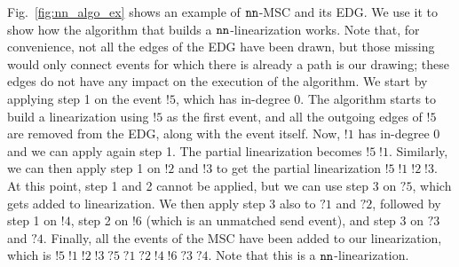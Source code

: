 \begin{example}
	Fig.~\ref{fig:nn_algo_ex} shows an example of $\mathtt{nn}$-MSC and its EDG. We use it to show how the algorithm that builds a $\mathtt{nn}$-linearization works. Note that, for convenience, not all the edges of the EDG have been drawn, but those missing would only connect events for which there is already a path is our drawing; these edges do not have any impact on the execution of the algorithm. We start by applying step 1 on the event $!5$, which has in-degree 0. The algorithm starts to build a linearization using $!5$ as the first event, and all the outgoing edges of $!5$ are removed from the EDG, along with the event itself. Now, $!1$ has in-degree 0 and we can apply again step 1. The partial linearization becomes $!5\;!1$. Similarly, we can then apply step 1 on $!2$ and $!3$ to get the partial linearization $!5\;!1\;!2\;!3$. At this point, step 1 and 2 cannot be applied, but we can use step 3 on $?5$, which gets added to linearization. We then apply step 3 also to $?1$ and $?2$, followed by step 1 on $!4$, step 2 on $!6$ (which is an unmatched send event), and step 3 on $?3$ and $?4$. Finally, all the events of the MSC have been added to our linearization, which is $!5\;!1\;!2\;!3\;?5\;?1\;?2\;!4\;!6\;?3\;?4$. Note that this is a $\mathtt{nn}$-linearization.
\end{example}

